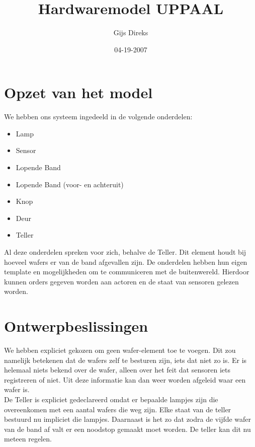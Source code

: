 \documentclass[]{article}
\title{Hardwaremodel UPPAAL }
\author{ Gijs Direks }
\date{04-19-2007}
\begin{document}
\section{Opzet van het model}
We hebben ons systeem ingedeeld in de volgende onderdelen:
\begin{itemize}
    \item Lamp
    \item Sensor
    \item Lopende Band
    \item Lopende Band (voor- en achteruit)
    \item Knop
    \item Deur
    \item Teller
\end{itemize}

Al deze onderdelen spreken voor zich, behalve de Teller. Dit element
houdt bij hoeveel wafers er van de band afgevallen zijn. De
onderdelen hebben hun eigen template en mogelijkheden om te
communiceren met de buitenwereld. Hierdoor kunnen orders gegeven
worden aan actoren en de staat van sensoren gelezen worden.


\section{Ontwerpbeslissingen}

We hebben expliciet gekozen om geen wafer-element toe te voegen. Dit
zou namelijk betekenen dat de wafers zelf te besturen zijn, iets dat
niet zo is. Er is helemaal niets bekend over de wafer, alleen over
het feit dat sensoren iets registreren of niet. Uit deze informatie
kan dan weer worden afgeleid waar een wafer is.\\

De Teller is expliciet gedeclareerd omdat er bepaalde lampjes zijn
die overeenkomen met een aantal wafers die weg zijn. Elke staat van
de teller bestuurd nu impliciet die lampjes. Daarnaast is het zo dat
zodra de vijfde wafer van de band af valt er een noodstop gemaakt
moet worden. De teller kan dit nu meteen regelen.
\end{document}
